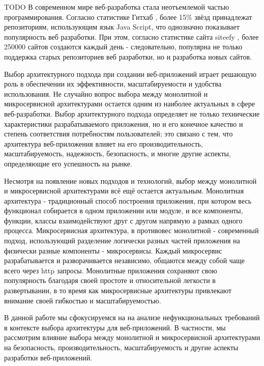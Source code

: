     TODO
    В современном мире веб-разработка стала неотъемлемой частью программирования. Согласно статистике Гитхаб \cite{githut}, более 15\% звёзд принадлежат репозиториям, использующим язык Java Script, что однозначно показывает популярность веб разработки. При этом, согласно статистике сайта siteefy \cite{websitesstats}, более 250000 сайтов создаются каждый день - следовательно, популярна не только поддержка старых репозиториев веб разработки, но и разработка новых сайтов.
    
    Выбор архитектурного подхода при создании веб-приложений играет решающую роль в обеспечении их эффективности, масштабируемости и удобства использования. Не случайно вопрос выбора между монолитной и микросервисной архитектурами остается одним из наиболее актуальных в сфере веб-разработки. Выбор архитектурного подхода определяет не только технические характеристики разрабатываемого приложения, но и его конечное качество и степень соответствия потребностям пользователей; это связано с тем, что архитектура веб-приложения влияет на его производительность, масштабируемость, надежность, безопасность, и многие другие аспекты, определяющие его успешность на рынке.
    
    Несмотря на появление новых подходов и технологий, выбор между монолитной и микросервисной архитектурами всё ещё остается актуальным. Монолитная архитектура - традиционный способ построения приложения, при котором весь функционал собирается в одном приложении или модуле, и все компоненты, функции, классы взаимодействуют друг с другом напрямую а рамках одного процесса. Микросервисная архитектура, в противовес монолитной - современный подход, использующий разделение логически разных частей приложения на физически разные компоненты - микросервисы. Каждый микросервис разрабатывается и разворачивается независимо, общаются между собой чаще всего через http запросы. Монолитные приложения сохраняют свою популярность благодаря своей простоте и относительной легкости в развертывании, в то время как микросервисные архитектуры привлекают внимание своей гибкостью и масштабируемостью.
    
    В данной работе мы сфокусируемся на  на анализе нефункциональных требований в контексте выбора архитектуры для веб-приложений. В частности, мы рассмотрим влияние выбора между монолитной и микросервисной архитектурами на безопасность, производительность, масштабируемость и другие аспекты разработки веб-приложений.

\clearpage